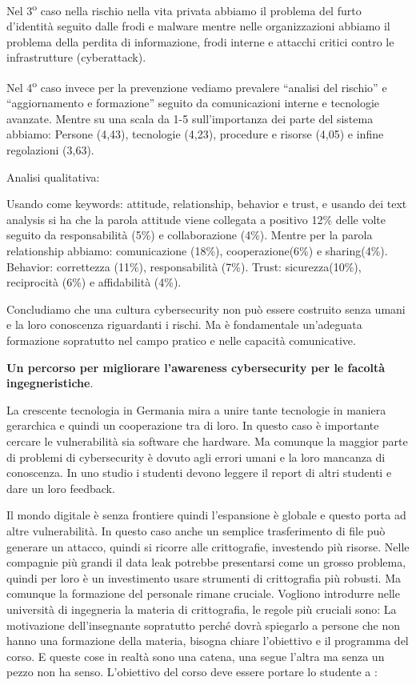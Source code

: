 \documentclass[a4page, 11pt, twocolumn]{article}
\begin{document}
Nel 3\textsuperscript{o} caso nella rischio nella vita privata abbiamo
il problema del furto d'identità seguito dalle frodi e malware mentre
nelle organizzazioni abbiamo il problema della perdita di informazione,
frodi interne e attacchi critici contro le infrastrutture (cyberattack).

Nel 4\textsuperscript{o} caso invece per la prevenzione vediamo
prevalere ``analisi del rischio'' e ``aggiornamento e formazione''
seguito da comunicazioni interne e tecnologie avanzate. Mentre su una
scala da 1-5 sull'importanza dei parte del sistema abbiamo: Persone
(4,43), tecnologie (4,23), procedure e risorse (4,05) e infine
regolazioni (3,63).

Analisi qualitativa:

Usando come keywords: attitude, relationship, behavior e trust, e usando
dei text analysis si ha che la parola attitude viene collegata a
positivo 12\% delle volte seguito da responsabilità (5\%) e
collaborazione (4\%). Mentre per la parola relationship abbiamo:
comunicazione (18\%), cooperazione(6\%) e sharing(4\%). Behavior:
correttezza (11\%), responsabilità (7\%). Trust: sicurezza(10\%),
reciprocità (6\%) e affidabilità (4\%).

Concludiamo che una cultura cybersecurity non può essere costruito senza
umani e la loro conoscenza riguardanti i rischi. Ma è fondamentale
un'adeguata formazione sopratutto nel campo pratico e nelle capacità
comunicative.

\textbf{Un percorso per migliorare l'awareness cybersecurity per le
	facoltà ingegneristiche}.

La crescente tecnologia in Germania mira a unire tante tecnologie in
maniera gerarchica e quindi un cooperazione tra di loro. In questo caso
è importante cercare le vulnerabilità sia software che hardware. Ma
comunque la maggior parte di problemi di cybersecurity è dovuto agli
errori umani e la loro mancanza di conoscenza. In uno studio i studenti
devono leggere il report di altri studenti e dare un loro feedback.

Il mondo digitale è senza frontiere quindi l'espansione è globale e
questo porta ad altre vulnerabilità. In questo caso anche un semplice
trasferimento di file può generare un attacco, quindi si ricorre alle
crittografie, investendo più risorse. Nelle compagnie più grandi il data
leak potrebbe presentarsi come un grosso problema, quindi per loro è un
investimento usare strumenti di crittografia più robusti. Ma comunque la
formazione del personale rimane cruciale. Vogliono introdurre nelle
università di ingegneria la materia di crittografia, le regole più
cruciali sono: La motivazione dell'insegnante sopratutto perché dovrà
spiegarlo a persone che non hanno una formazione della materia, bisogna
chiare l'obiettivo e il programma del corso. E queste cose in realtà
sono una catena, una segue l'altra ma senza un pezzo non ha senso.
L'obiettivo del corso deve essere portare lo studente a :
\end{document}
